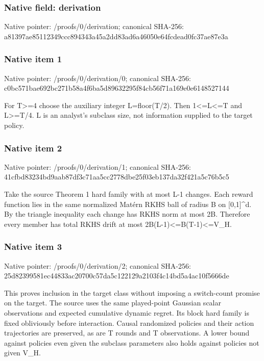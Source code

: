 \documentclass[10pt,a4paper]{article}
\begin{document}
\subsubsection{Native field: derivation}
Native pointer: /proofs/0/derivation; canonical SHA-256: a81397ae85112349ccc894343a45a2dd83ad6a46050e64fcdead0fc37ae87e3a

\subsubsection{Native item 1}
Native pointer: /proofs/0/derivation/0; canonical SHA-256: c0bc571bae692bc271b58a4f6ba5d89632295f84cb56f71a169e0e6148527144

\begingroup\raggedright\sloppy For T>=\allowbreak{}4 choose the auxiliary integer L=\allowbreak{}floor(T/\allowbreak{}2). Then 1<=\allowbreak{}L<=\allowbreak{}T and L>=\allowbreak{}T/\allowbreak{}4. L is an analyst's subclass size,\allowbreak{} not information supplied to the target policy.\par\endgroup

\subsubsection{Native item 2}
Native pointer: /proofs/0/derivation/1; canonical SHA-256: 41cfbd83234bd9aab87df3c71aa5cc2778dbe25f03eb137da32f421a5c76b5c5

\begingroup\raggedright\sloppy Take the source Theorem 1 hard family with at most L-1 changes. Each reward function lies in the same normalized Mat{\AtlasUnicodeText é}\allowbreak{}rn RKHS ball of radius B on [0,\allowbreak{}1]\textasciicircum{}d. By the triangle inequality each change has RKHS norm at most 2B. Therefore every member has total RKHS drift at most 2B(L-1)<=\allowbreak{}B(T-1)<=\allowbreak{}V\_\allowbreak{}H.\par\endgroup

\subsubsection{Native item 3}
Native pointer: /proofs/0/derivation/2; canonical SHA-256: 25d82399581ec44833ac20700c57da5c122129a2103f4c14bd5a4ac10f5666de

\begingroup\raggedright\sloppy This proves inclusion in the target class without imposing a switch-count promise on the target. The source uses the same played-point Gaussian scalar observations and expected cumulative dynamic regret. Its block hard family is fixed obliviously before interaction. Causal randomized policies and their action trajectories are preserved,\allowbreak{} as are T rounds and T observations. A lower bound against policies even given the subclass parameters also holds against policies not given V\_\allowbreak{}H.\par\endgroup
\end{document}
